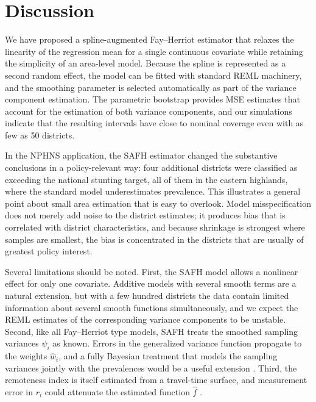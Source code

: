 \section{Discussion}
\label{sec:discussion}

We have proposed a spline-augmented Fay--Herriot estimator that relaxes the
linearity of the regression mean for a single continuous covariate while
retaining the simplicity of an area-level model. Because the spline is
represented as a second random effect, the model can be fitted with standard
REML machinery, and the smoothing parameter is selected automatically as part
of the variance component estimation. The parametric bootstrap provides MSE
estimates that account for the estimation of both variance components, and our
simulations indicate that the resulting intervals have close to nominal
coverage even with as few as 50 districts.

In the NPHNS application, the SAFH estimator changed the substantive
conclusions in a policy-relevant way: four additional districts were classified
as exceeding the national stunting target, all of them in the eastern
highlands, where the standard model underestimates prevalence. This illustrates
a general point about small area estimation that is easy to overlook. Model
misspecification does not merely add noise to the district estimates; it
produces bias that is correlated with district characteristics, and because
shrinkage is strongest where samples are smallest, the bias is concentrated in
the districts that are usually of greatest policy interest.

Several limitations should be noted. First, the SAFH model allows a nonlinear
effect for only one covariate. Additive models with several smooth terms are a
natural extension, but with a few hundred districts the data contain limited
information about several smooth functions simultaneously, and we expect the
REML estimates of the corresponding variance components to be unstable. Second,
like all Fay--Herriot type models, SAFH treats the smoothed sampling variances
$\psi_i$ as known. Errors in the generalized variance function propagate to the
weights $\hat w_i$, and a fully Bayesian treatment that models the sampling
variances jointly with the prevalences would be a useful extension
\citep{you2006small}. Third, the remoteness index is itself estimated from a
travel-time surface, and measurement error in $r_i$ could attenuate the
estimated function $\hat f$ \citep{ybarra2008small}.

